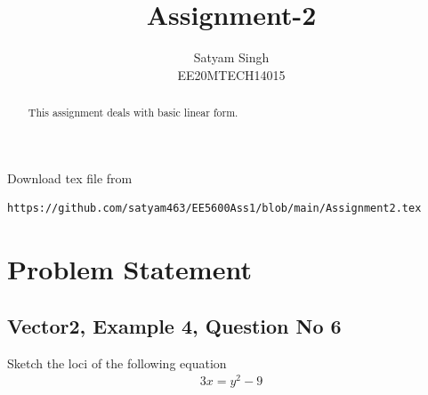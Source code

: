 \documentclass[journal,12pt,twocolumn]{IEEEtran}
\begin{document}
\renewcommand{\thefigure}{\theproblem}
\def\putbox#1#2#3{\makebox[0in][l]{\makebox[#1][l]{}\raisebox{\baselineskip}[0in][0in]{\raisebox{#2}[0in][0in]{#3}}}}
     \def\rightbox#1{\makebox[0in][r]{#1}}
     \def\centbox#1{\makebox[0in]{#1}}
     \def\topbox#1{\raisebox{-\baselineskip}[0in][0in]{#1}}
     \def\midbox#1{\raisebox{-0.5\baselineskip}[0in][0in]{#1}}
\vspace{3cm}
\title{Assignment-2}
\author{Satyam Singh \\ EE20MTECH14015}
\maketitle
\newpage
\bigskip
\renewcommand{\thefigure}{\theenumi}
\renewcommand{\thetable}{\theenumi}
\begin{abstract}
This assignment deals with basic linear form.
\end{abstract}
Download  tex file from 
\begin{lstlisting}
https://github.com/satyam463/EE5600Ass1/blob/main/Assignment2.tex
\end{lstlisting}
\section{Problem Statement}
\subsection{Vector2, Example 4, Question No 6}
Sketch the loci of the following equation
\begin{align}
    3x=y^{2}-9
\end{align}
\end{document}
